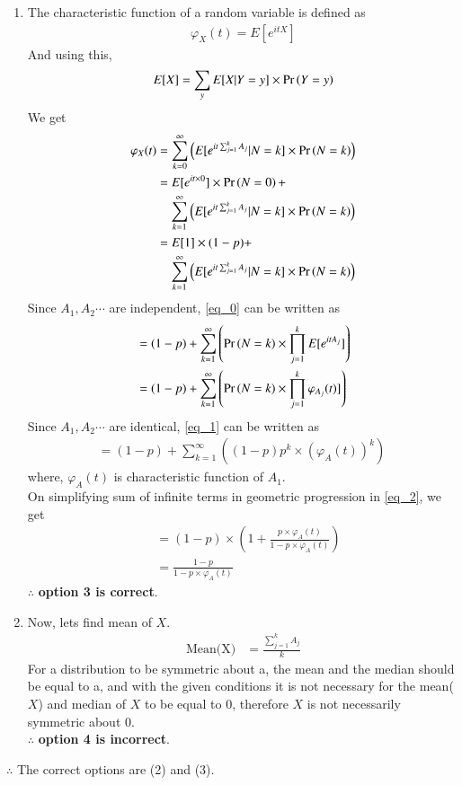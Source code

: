 \documentclass[journal,12pt,twocolumn]{IEEEtran}
\begin{document}
\begin{enumerate}
\item The characteristic function of a random variable is defined as
\begin{align}
    \varphi_X(t)=E[e^{itX}]
\end{align}
And using this,
\begin{align}
    E[X]=\sum_{y} E[X|Y=y]\times \Pr\left(Y=y\right)
\end{align}
We get 
\begin{align}
    \varphi_X(t)&=\sum_{k=0}^{\infty}\left(E[e^{it\sum_{j=1}^{k} A_j}
    |N=k]\times \pr{N=k}\right)\\
    &\begin{multlined}
    =E[e^{it\times 0}]\times \pr{N=0}+\\
    \sum_{k=1}^{\infty}\left(E[e^{it\sum_{j=1}^{k} A_j}
    |N=k]\times \pr{N=k}\right)
    \end{multlined}\\
    &\begin{multlined}
    =E[1]\times (1-p)+\\
    \sum_{k=1}^{\infty}\left(E[e^{it\sum_{j=1}^{k} A_j}|N=k]\times \pr{N=k}\right) \label{eq_0}
    \end{multlined}\\
\end{align}
Since $A_1,A_2\cdots$ are independent, \eqref{eq_0} can be written as
\begin{align}
    &=(1-p)+\sum_{k=1}^{\infty}\left(\Pr\left(N=k\right)\times\prod_{j=1}^k E[e^{itA_j}]\right) \\
    &=(1-p)+\sum_{k=1}^{\infty}\left(\Pr\left(N=k\right)\times\prod_{j=1}^k \varphi_{A_j}(t)]\right) \label{eq_1}
\end{align}
Since $A_1,A_2\cdots$ are identical, \eqref{eq_1} can be written as
\begin{align}
    =(1-p)+\sum_{k=1}^{\infty}\left((1-p)p^k\times(\varphi_{A}(t))^k\right)\;\label{eq_2}
\end{align}
where, $\varphi_{A}(t)$ is characteristic function of $A_1$.\\
On simplifying sum of infinite terms in geometric progression in \eqref{eq_2}, we get
\begin{align}
    &=(1-p)\times \left(1+\frac{p\times \varphi_A(t)}{1-p\times \varphi_A(t)}\right)\\
    &=\frac{1-p}{1-p\times \varphi_A(t) }
\end{align}
$\therefore$ \textbf{option 3 is correct}.\\

\item Now, lets find mean of $X$.
\begin{align}
    \text{Mean(X)}&=\frac{\sum_{j=1}^{k} A_j}{k}
\end{align}
For a distribution to be symmetric about a, the mean and the median should be equal to a, and with the given conditions it is not necessary for the mean($X$) and median of $X$ to be equal to 0, therefore $X$ is not necessarily symmetric about 0.\\
$\therefore$ \textbf{option 4 is incorrect}.
\end{enumerate}
$\therefore$ The correct options are (2) and (3).
\end{document}
